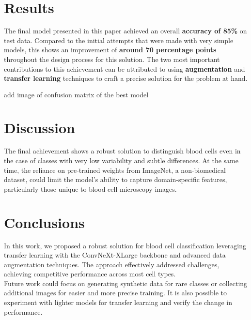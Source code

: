 \documentclass[11pt]{article}
\begin{document}
\begin{multicols}{2}
        
    \section{Results}
		The final model presented in this paper achieved an overall \textbf{accuracy of 85\%} on test data. Compared to the initial attempts that were made with very simple models, this shows an improvement of \textbf{around 70 percentage points} throughout the design process for this solution. The two most important contributions to this achievement can be attributed to using \textbf{augmentation} and \textbf{transfer learning} techniques to craft a precise solution for the problem at hand.

        \color{red}add image of confusion matrix of the best model \color{black} 
        
    \section{Discussion}
        The final achievement shows a robust solution to distinguish blood cells even in the case of classes with very low variability and subtle differences. At the same time, the reliance on pre-trained weights from ImageNet, a non-biomedical dataset, could limit the model's ability to capture domain-specific features, particularly those unique to blood cell microscopy images. 

        
    \section{Conclusions}
	In this work, we proposed a robust solution for blood cell classification leveraging transfer learning with the ConvNeXt-XLarge backbone and advanced data augmentation techniques. The approach effectively addressed challenges, achieving competitive performance across most cell types. \\
    Future work could focus on generating synthetic data for rare classes or collecting additional images for easier and more precise training. It is also possible to experiment with lighter models for transfer learning and verify the change in performance.
\cite{mixup}
        


        
        
    
    
    \end{multicols}
\end{document}
